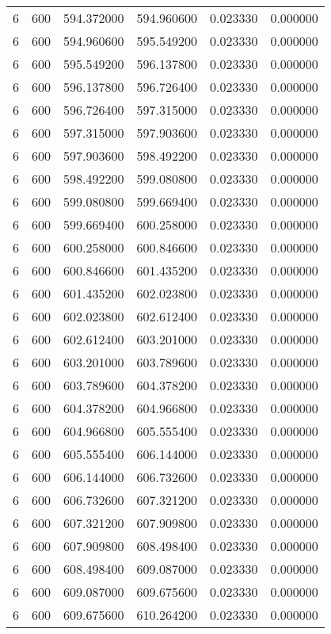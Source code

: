 \begin{longtable}{rrrrrr}
6 & 600 & 594.372000 & 594.960600 & 0.023330 & 0.000000 \\
6 & 600 & 594.960600 & 595.549200 & 0.023330 & 0.000000 \\
6 & 600 & 595.549200 & 596.137800 & 0.023330 & 0.000000 \\
6 & 600 & 596.137800 & 596.726400 & 0.023330 & 0.000000 \\
6 & 600 & 596.726400 & 597.315000 & 0.023330 & 0.000000 \\
6 & 600 & 597.315000 & 597.903600 & 0.023330 & 0.000000 \\
6 & 600 & 597.903600 & 598.492200 & 0.023330 & 0.000000 \\
6 & 600 & 598.492200 & 599.080800 & 0.023330 & 0.000000 \\
6 & 600 & 599.080800 & 599.669400 & 0.023330 & 0.000000 \\
6 & 600 & 599.669400 & 600.258000 & 0.023330 & 0.000000 \\
6 & 600 & 600.258000 & 600.846600 & 0.023330 & 0.000000 \\
6 & 600 & 600.846600 & 601.435200 & 0.023330 & 0.000000 \\
6 & 600 & 601.435200 & 602.023800 & 0.023330 & 0.000000 \\
6 & 600 & 602.023800 & 602.612400 & 0.023330 & 0.000000 \\
6 & 600 & 602.612400 & 603.201000 & 0.023330 & 0.000000 \\
6 & 600 & 603.201000 & 603.789600 & 0.023330 & 0.000000 \\
6 & 600 & 603.789600 & 604.378200 & 0.023330 & 0.000000 \\
6 & 600 & 604.378200 & 604.966800 & 0.023330 & 0.000000 \\
6 & 600 & 604.966800 & 605.555400 & 0.023330 & 0.000000 \\
6 & 600 & 605.555400 & 606.144000 & 0.023330 & 0.000000 \\
6 & 600 & 606.144000 & 606.732600 & 0.023330 & 0.000000 \\
6 & 600 & 606.732600 & 607.321200 & 0.023330 & 0.000000 \\
6 & 600 & 607.321200 & 607.909800 & 0.023330 & 0.000000 \\
6 & 600 & 607.909800 & 608.498400 & 0.023330 & 0.000000 \\
6 & 600 & 608.498400 & 609.087000 & 0.023330 & 0.000000 \\
6 & 600 & 609.087000 & 609.675600 & 0.023330 & 0.000000 \\
6 & 600 & 609.675600 & 610.264200 & 0.023330 & 0.000000 \\

\end{longtable}
